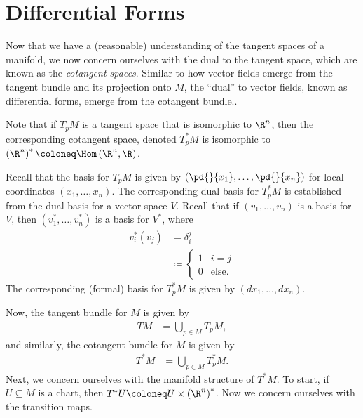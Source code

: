 \documentclass[10pt]{mypackage}
\begin{document}
\section{Differential Forms}%
Now that we have a (reasonable) understanding of the tangent spaces of a manifold, we now concern ourselves with the dual to the tangent space, which are known as the \textit{cotangent spaces}. Similar to how vector fields emerge from the tangent bundle and its projection onto $M$, the ``dual'' to vector fields, known as differential forms, emerge from the cotangent bundle..\newline

Note that if $T_pM$ is a tangent space that is isomorphic to $\R^{n}$, then the corresponding cotangent space, denoted $T^{\ast}_pM$ is isomorphic to $\left( \R^{n} \right)^{\ast} \coloneq \Hom\left( \R^{n},\R \right)$.\newline

Recall that the basis for $T_pM$ is given by $\left( \pd{}{x_1},\dots,\pd{}{x_n} \right)$ for local coordinates $\left( x_1,\dots,x_n \right)$. The corresponding dual basis for $T_p^{\ast}M$ is established from the dual basis for a vector space $V$. Recall that if $\left( v_1,\dots,v_n \right)$ is a basis for $V$, then $\left( v_1^{\ast},\dots,v_n^{\ast} \right)$ is a basis for $V^{\ast}$, where
\begin{align*}
  v_i^{\ast}\left( v_j \right) &= \delta_{i}^{j}\\
                               &\coloneq \begin{cases}
                                 1 & i = j\\
                                 0 & \text{else}.
                               \end{cases}
\end{align*}
The corresponding (formal) basis for $T_p^{\ast}M$ is given by $\left( dx_1,\dots,dx_n \right)$.\newline

Now, the tangent bundle for $M$ is given by
\begin{align*}
  TM &= \bigcup_{p\in M} T_pM,
\end{align*}
and similarly, the cotangent bundle for $M$ is given by
\begin{align*}
  T^{\ast}M &= \bigcup_{p\in M}T_p^{\ast}M.
\end{align*}
Next, we concern ourselves with the manifold structure of $T^{\ast}M$. To start, if $U\subseteq M$ is a chart, then $T^{\ast}U \coloneq U\times \left( \R^{n} \right)^{\ast}$. Now we concern ourselves with the transition maps.\newline
\end{document}
